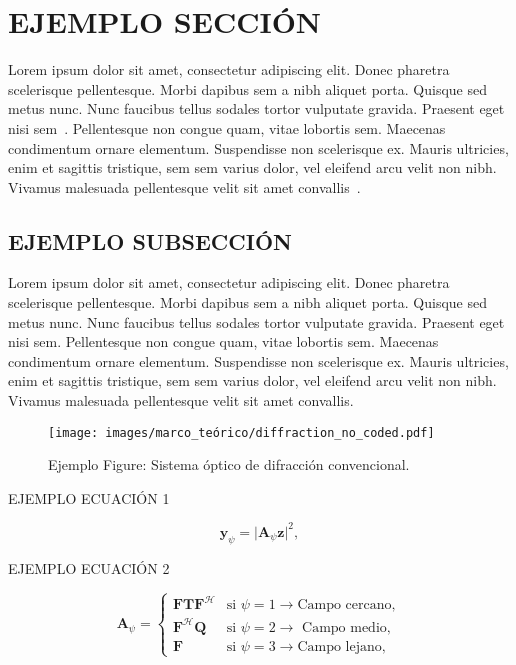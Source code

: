 \chapter{EJEMPLO SECCIÓN}

Lorem ipsum dolor sit amet, consectetur adipiscing elit. Donec pharetra scelerisque pellentesque. Morbi dapibus sem a nibh aliquet porta. Quisque sed metus nunc. Nunc faucibus tellus sodales tortor vulputate gravida. Praesent eget nisi sem~. Pellentesque non congue quam, vitae lobortis sem. Maecenas condimentum ornare elementum. Suspendisse non scelerisque ex. Mauris ultricies, enim et sagittis tristique, sem sem varius dolor, vel eleifend arcu velit non nibh. Vivamus malesuada pellentesque velit sit amet convallis~.


    
\section{EJEMPLO SUBSECCIÓN}

Lorem ipsum dolor sit amet, consectetur adipiscing elit. Donec pharetra scelerisque pellentesque. Morbi dapibus sem a nibh aliquet porta. Quisque sed metus nunc. Nunc faucibus tellus sodales tortor vulputate gravida. Praesent eget nisi sem. Pellentesque non congue quam, vitae lobortis sem. Maecenas condimentum ornare elementum. Suspendisse non scelerisque ex. Mauris ultricies, enim et sagittis tristique, sem sem varius dolor, vel eleifend arcu velit non nibh. Vivamus malesuada pellentesque velit sit amet convallis.

\begin{figure}[!h]
    \centering
    \caption{\hspace{2mm}Ejemplo Figure: Sistema óptico de difracción convencional.}
    \texttt{[image: images/marco\_teórico/diffraction\_no\_coded.pdf]}
    \label{fig:difraction_systems}
\end{figure}

EJEMPLO ECUACIÓN 1

\begin{equation}
    \mathbf{y}_{\psi}= \vert \mathbf{A}_\psi \mathbf{z} \vert^2,
    \label{eq:diffraction_base}
\end{equation}


EJEMPLO ECUACIÓN 2

\begin{equation}
    \mathbf{A}_\psi = \left\{\begin{matrix}
 \mathbf{F}\mathbf{T}\mathbf{F}^\mathcal{H}    & \text{si } \psi=1\rightarrow \text{Campo cercano},\\ 
 \mathbf{F}^\mathcal{H}\mathbf{Q} &\text{si } \psi=2\rightarrow\text{ Campo medio}, \\ 
 \mathbf{F}  &\text{si } \psi=3\rightarrow\text{Campo lejano},
\end{matrix}\right. \label{eq:matrix_a_no_coded}
\end{equation}

